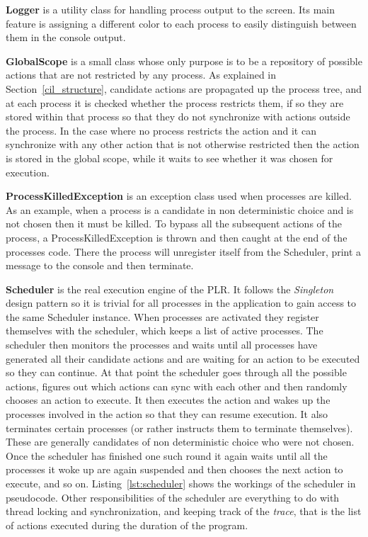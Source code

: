 	\textbf{Logger} is a utility class for handling process output to the screen.
	Its main feature is assigning a different color to each process to 
	easily distinguish between them in the console output.

	\textbf{GlobalScope} is a small class whose only purpose is to be a 
	repository of possible actions that are not restricted by any process. As
	explained in Section~\ref{cil_structure}, candidate actions are propagated 
	up the process tree, and at each process it is checked whether the process 
	restricts them, if so they are stored within that process so that they do
	not synchronize with actions outside the process. In the case where no
	process restricts the action and it can synchronize with any other action
	that is not otherwise restricted then the action is stored in the global 
	scope, while it waits to see whether it was chosen for execution.
	
	\textbf{ProcessKilledException} is an exception class used when processes
	are killed. As an example, when a process is a candidate in non deterministic
	choice and is not chosen then it must be killed. To bypass all the subsequent
	actions of the process, a \textsf{ProcessKilledException} is thrown and then
	caught at the end of the processes code. There the process will unregister
	itself from the \textsf{Scheduler}, print a message to the console and then
	terminate.
	
	\textbf{Scheduler} is the real execution engine of the PLR. It follows the
	\textit{Singleton} \cite{design_patterns} design pattern so it is trivial 
	for all	processes in the application to gain access to the same 
	\textsf{Scheduler} instance. When processes are activated they register 
	themselves with the scheduler, which keeps a list of active processes. The 
	scheduler then monitors the processes and waits until all processes have 
	generated all their candidate actions and are waiting for an action to be 
	executed so they can continue. At that point the scheduler goes through all 
	the possible actions, figures out which actions can sync with each other and 
	then randomly chooses an action to execute. It then executes the action and 
	wakes up the processes involved in the action so that they can resume 
	execution. It also terminates certain processes (or rather instructs them to 
	terminate themselves). These are generally candidates of non deterministic 
	choice who were not chosen. Once the scheduler has finished one such round 
	it again waits until all the processes it woke up are again suspended and 
	then chooses the next action to execute, and so on. 
	Listing~\ref{lst:scheduler} shows the workings of the scheduler in 
	pseudocode. Other responsibilities of the scheduler are everything to do 
	with thread locking and synchronization, and keeping track of the 
	\textit{trace}, that is the list of actions executed during the duration of 
	the program.
	 
